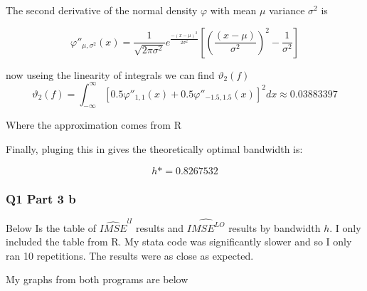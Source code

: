 \documentclass[11pt]{article}
\begin{document}
The second derivative of the normal density $\varphi$ with mean $\mu$ variance $\sigma^2$ is 

$$\varphi''_{\mu, \sigma^2}(x) = \frac{1}{\sqrt{2 \pi \sigma^2 }}e^{\frac{-(x-\mu)^2}{2\sigma^2}} \left[ \left( \frac{(x - \mu)}{\sigma^2} \right)^2 - \frac{1}{\sigma^2} \right]
$$

now useing the linearity of integrals we can find $\vartheta_{2}(f)$
$$ \vartheta_{2}(f) = \int_{-\infty}^{\infty} [0.5 \varphi''_{1,1}(x) + 0.5 \varphi''_{-1.5, 1.5}(x)]^2dx \approx 0.03883397
$$

Where the approximation comes from R 

Finally, pluging this in gives the theoretically optimal bandwidth is: 

$$h* = 0.8267532
$$

\subsubsection{Q1 Part 3 b}

Below Is the table of $\widehat{IMSE}^{lI}$ results and $\widehat{IMSE^{LO}}$ results by bandwidth $h$. I only included the table from R. My stata code was significantly slower and so I only ran 10 repetitions. The results were as close as expected. 

\begin{center}
	
\end{center}

My graphs from both programs are below 
\end{document}
